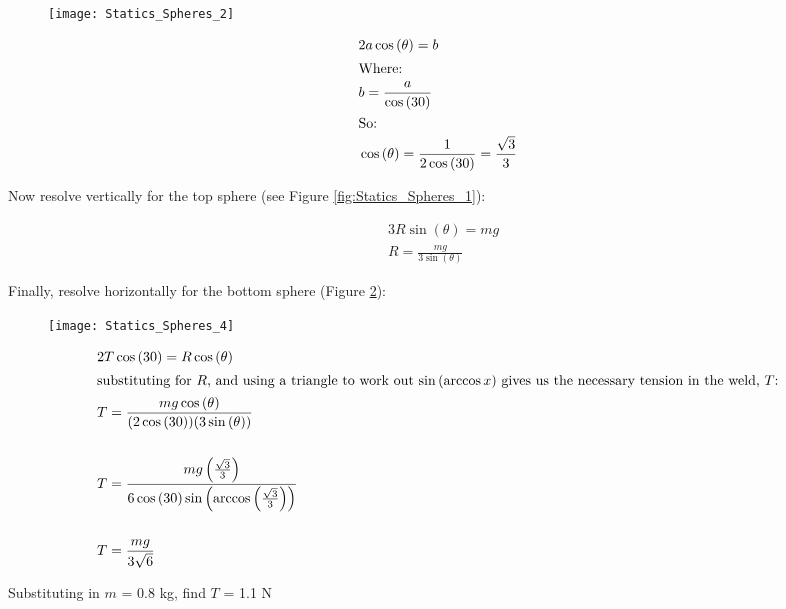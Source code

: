 \begin{problem}
{\begin{figure}[h]
	\centering
	\texttt{[image: Statics\_Spheres\_2]}
	\caption{}	
	\label{fig:Statics_Spheres_2}
\end{figure}

\begin{align*} &2a\cos{(\theta)} = b \\
\intertext{Where:}& b = \frac{a}{\cos{(30)}} \\
\intertext{So:} &\cos{(\theta)}= \frac{1}{2\cos{(30)}} = \frac{\sqrt{3}}{3}\\ \end{align*}

Now resolve vertically for the top sphere (see Figure \ref{fig:Statics_Spheres_1}):

\begin{align*} &3R\sin{(\theta)} = mg \\
&R = \frac{mg}{3\sin{(\theta)}} \end{align*}

Finally, resolve horizontally for the bottom sphere (Figure \ref{fig:Statics_Spheres_4}):

\begin{figure}[h]
	\centering
	\texttt{[image: Statics\_Spheres\_4]}
	\caption{}	
	\label{fig:Statics_Spheres_4}
\end{figure}

\begin{align*} &2T\cos{(30)} = R\cos{(\theta)} \\
\intertext{substituting for $R$, and using a triangle to work out $\sin{(\arccos{x})}$ gives us the necessary tension in the weld, $T$:} &T = \frac{mg\cos{(\theta)}}{(2\cos{(30)})(3\sin{(\theta)})} \\
\\ &T = \frac{mg\left(\frac{\sqrt{3}}{3}\right)}{6\cos{(30)}\sin{\left(\arccos{\left(\frac{\sqrt{3}}{3}\right)}\right)}} \\
\\ &T = \frac{mg}{3\sqrt{6}}\end{align*}

Substituting in $m$ = 0.8 kg, find $T$ = 1.1 N
}
\end{problem}